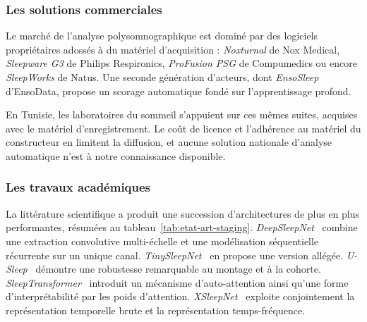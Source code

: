 \subsubsection{Les solutions commerciales}

Le marché de l'analyse polysomnographique est dominé par des logiciels propriétaires
adossés à du matériel d'acquisition : \emph{Noxturnal} de Nox Medical, \emph{Sleepware
G3} de Philips Respironics, \emph{ProFusion PSG} de Compumedics ou encore
\emph{SleepWorks} de Natus. Une seconde génération d'acteurs, dont \emph{EnsoSleep}
d'EnsoData, propose un scorage automatique fondé sur l'apprentissage profond.

En Tunisie, les laboratoires du sommeil s'appuient sur ces mêmes suites, acquises avec
le matériel d'enregistrement. Le coût de licence et l'adhérence au matériel du
constructeur en limitent la diffusion, et aucune solution nationale d'analyse
automatique n'est à notre connaissance disponible.

\subsubsection{Les travaux académiques}

La littérature scientifique a produit une succession d'architectures de plus en plus
performantes, résumées au tableau~\ref{tab:etat-art-staging}.
\emph{DeepSleepNet}~\cite{supratak2017} combine une extraction convolutive
multi-échelle et une modélisation séquentielle récurrente sur un unique canal.
\emph{TinySleepNet}~\cite{supratak2020} en propose une version allégée.
\emph{U-Sleep}~\cite{perslev2021} démontre une robustesse remarquable au montage et à
la cohorte. \emph{SleepTransformer}~\cite{phan2022} introduit un mécanisme
d'auto-attention ainsi qu'une forme d'interprétabilité par les poids d'attention.
\emph{XSleepNet}~\cite{phan2021} exploite conjointement la représentation temporelle
brute et la représentation temps-fréquence.

